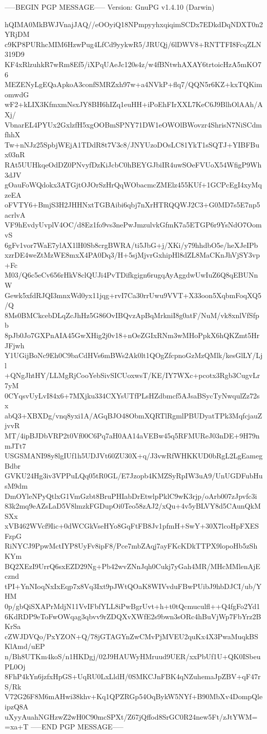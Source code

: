 -----BEGIN PGP MESSAGE-----
Version: GnuPG v1.4.10 (Darwin)

hQIMA0MkBWJVnajJAQ//eOOyiQ18NPmpyyhxqiqimSCDx7EDkdDqNDXT0n2YRjDM
c9KP8PURhcMIM6HzwPug4LfCd9yykwR5/JRUQj/6lDWV8+RNTTFI8FcqZLN319D9
KF4xRlzuhkR7wRm8Ef5/iXPqUAeJc120s4z/w4fBNtwhAXAY6trtoicHzA5mKO76
MEZENyLgEQaApkoA3confSMRZxh97w+a4NVkP+flq7/QQN5r6KZ+kxTQKimomwdG
wF2+kLIX3KfmxmNsxJY8BH6hIZq1euHH+iPoEhFIrXXL7KeC6J9BlhOlAAh/AXj/
VbnarEL4PYUx2GxlzfH5xgOOBmSPNY71DW1eOWOlBWovzr4ShrisN7NiSCdmfhhX
Tw+nNJz25SpbjWEjA1TDdR8t7V3c8/JNYUzoDOsLC81YkT1sSQTJ+YIBFBux03nR
RAt5UUHkqeOdDZ0PNvyfDzKiJcbC0hBEYGJbiIR4uwSOeFVUoX54WfigP9Wh3dJV
gOauFoWQdokx3ATGjtOJOrSzHrQqWObacmcZMElz455KUf+1GCPcEgI4xyMqzeEA
oFVTY6+BmjS3H2JHHNxtTGBAibi6qbj7nXrHTRQQWJ2C3+G0MD7s5E7np5acrlvA
VF9hEvdyUvplV4OC/d8Ez1fo9vs3nePwJmzulvkGfmK7a5ETGP6r9YsNdO7OomvS
6gFv1vor7WaE7ylAX1lH0Sb8crgBWRA/ti5JbG+j/XKi/y79hhdbO5e/heXJeIPb
xzrDE4weZtMzWE8mxX4PA0Dq3/H+5sjMjvrGxhipHl8dZL8MaCKnJhVjSY3vp+Fc
M03/Q6c5eCv656rHkV8clQUJi4PvTDifkgign6rugqAyAggdwUwIuZ6Q8qEBUNnW
Gewk5xfdRJQI3mnxWd0yx11jqg+rvI7Ca30rrUwu9VVT+X33oon5XqbmFoqXQ5/Q
8Ms0BMCkcebDLqZcJhHz5G86OvIBQvzApBqMrkniI8g0atF/NuM/vk8xnlVfSfpb
8pJb0Jo7GXPnAIA45GwXHig2j0v18+nOeZGIxRNm3wMHoPpkX6hQKZmt5HrJFjwh
Y1UGijBoNc9Eh0C9baCdHVs6mBWs2Ak0lt1QOgZfcpnoGzMzQMlk/kesGlLY/Ljl
+QNgJhtHY/LLMgRjCooYebSivSICUoxwsT/KE/IY7WXc+pcotx3Rgb3CugvLr7yM
0CYqsvUyLvI84x6+7MXjku334CXYsUTfPLsHZdbmcf5AJsaBSycTyNwqulZz72sx
abQ3+XBXDg/vnq8yxi1A/AGqBJO48ObmXQRTlRgmlPBUDyatTPk3MqfcjauZjvvR
MT/4ipBJDbVRP2t0Vf00C6Pq7aH0AA14aVEBw45q5RFMUReJ03nDE+9H79nmJTt7
USGSMANI98y8lgIUf1h5UDJVt60ZU30X+q/J3vwRfWHKKUD0bRgL2LgEamegBdbr
GVKU24Hg3iv3VPPuLQq05tR0GL/E7Jzopb4KMZSyRpIW3uA9/UnUGDFubHusM9dm
DmOYleNPyQtlxG1VmGzbt8BruPHIabDrEtwlpPklC9wK3rjp/oArb007zJpvfc3i
83k2mq9eAZsLaD5V8lmzkFGDupOi0Teo58zAJ2/xQu+4v5yBLVY8d5CAunQkMSXx
xVB462WVcf9Iic+0dWCGkVseHYo8GqFtFB8Jv1pfmH+SwY+30X7lcoHpFXESFzpG
RiNYCJ9PpwMctIYP8UyFv8ipF8/Pce7mbZAqj7ayFKcKDkTTPX9lopoHb5zShKYm
BQ2XEzI9UrrQ6sxEZD29Ng+Pb42wvZNnJqh0Cukj7yGah4MR/MHcMMlenAjEcznd
tPI+YnNIoqNxIxEqp7x8Vq3Ixt9pJWtQOaK8WIVvduFBwPUibJ9hbDJCI/ub/YHM
0p/gbQiSXAPrMdjN11VvIFbfYLL8iPwBgrUvt+h+t0tQcmuculfl++Q4fgFo2Yd1
6KdRDP9eToFwOWqag3qbvv9rZDQXvXWfE2s9bwn3sORc4hBuVjWp7FbYrz2BKrSa
cZWJDVQo/PxYZON+Q/78jGTAGYnZwCMvPjMVEU2quKx4X3PwaMuqkBSKlAmd/uEP
n/Bh8UTKm4koS/n1HKDgj/02J9HAUWyHMruud9UER/xxPbUf1U+QK0ISbeuPL0Oj
8FhP4kYn6jzfxHpGS+UqRU0LxLldH/0SMKCJnFBK4qNZuhemaJpZBV+qF47rS/Rk
V72G26F8M6mAHwi38khv+Kq1QPZRGp54OqBykW5NYf+B90MbXv4DompQleipzQ8A
uXyyAuahNGHzwZ2wH0C90mcSPXt/Z67jQffod8SrGC0R24new5Ft/zJtYWM=
=xa+T
-----END PGP MESSAGE-----
